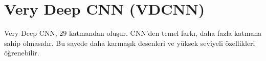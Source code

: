 \section{Very Deep CNN (VDCNN)}
Very Deep CNN, 29 katmandan oluşur. CNN'den temel farkı, daha fazla katmana sahip olmasıdır. Bu sayede daha karmaşık desenleri ve yüksek seviyeli özellikleri öğrenebilir. 

\newpage